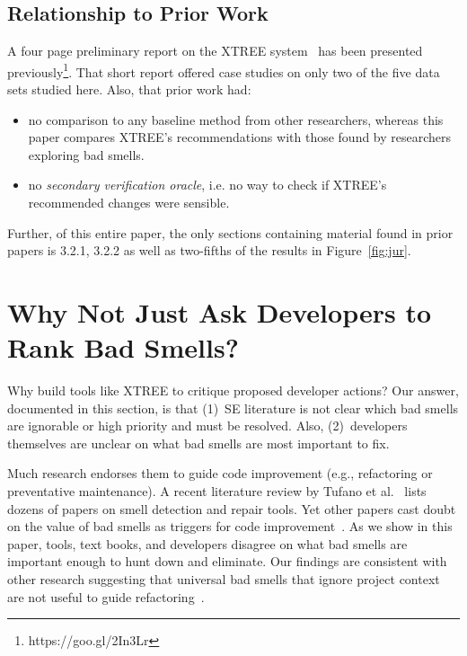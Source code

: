\documentclass[twocolumn,5p]{elsarticle}
\newcommand{\bi}{\begin{itemize}[leftmargin=0.4cm]}
\newcommand{\ei}{\end{itemize}}
\newcommand{\fig}[1]{Figure~\ref{fig:#1}}
\theoremstyle{break}
\begin{document}
	\subsection{Relationship to Prior Work }
	A four page preliminary report on the XTREE system~\cite{krishna2015actionable} has been presented previously\footnote{https://goo.gl/2In3Lr}. That short report offered case studies on only two  of
	the five data sets studied here. Also, that prior work had:
	\bi
	\item
	no comparison to any baseline
	method from other researchers, whereas this paper compares XTREE's recommendations
	with those found by researchers exploring bad smells.
	\item
	no {\em secondary verification oracle}, i.e. no way to check if XTREE's recommended changes were sensible.
	\ei
	Further, of this entire paper, the only sections containing material
	found in prior papers is 3.2.1, 3.2.2 as well as two-fifths of the results in \fig{jur}. 
	
	
	
	\section{Why Not Just Ask Developers to Rank Bad Smells?}\label{sect:prelim}
	
	Why build tools like XTREE to  critique proposed developer actions?
	Our answer, documented in this section, is that (1)~SE literature is not clear which bad smells are ignorable or  high priority and must be resolved.
	Also, (2)~developers themselves are unclear on what bad smells are most important to fix.
	
	
	Much research endorses them to guide
	code improvement (e.g., refactoring or preventative maintenance). A recent literature review by Tufano et al.~\cite{Tufano2015}  
	lists dozens of papers on smell detection and repair tools. 
	Yet
	other papers cast doubt on the value of bad smells
	as triggers for code improvement~\cite{Mantyla2004,Yamashita2013,Sjoberg2013}. 
	As we show in this paper,  
	tools, text books, and developers disagree on what bad smells
	are important enough to hunt down and eliminate. Our findings
	are consistent with other research suggesting that universal bad
	smells that ignore project context are not useful to guide refactoring~\cite{Mantyla2004,Yamashita2013,Sjoberg2013}.
	
\end{document}
